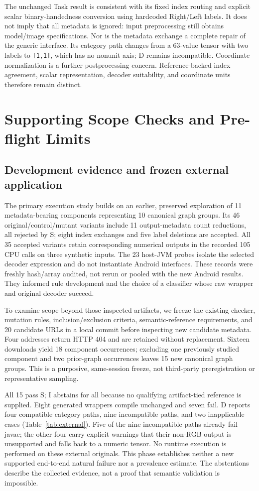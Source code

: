 \documentclass[10pt,twocolumn,letterpaper]{article}
\newcommand{\code}[1]{\texttt{#1}}
\begin{document}
The unchanged Task result is consistent with its fixed index routing and explicit scalar binary-handedness conversion using hardcoded Right/Left labels. It does not imply that all metadata is ignored: input preprocessing still obtains model/image specifications. Nor is the metadata exchange a complete repair of the generic interface. Its category path changes from a 63-value tensor with two labels to \code{[1,1]}, which has no nonunit axis; D remains incompatible. Coordinate normalization is a further postprocessing concern. Reference-backed index agreement, scalar representation, decoder suitability, and coordinate units therefore remain distinct.

\section{Supporting Scope Checks and Pre-flight Limits}
\label{sec:scope}
\subsection{Development evidence and frozen external application}
The primary execution study builds on an earlier, preserved exploration of 11 metadata-bearing components representing 10 canonical graph groups. Its 46 original/control/mutant variants include 11 output-metadata count reductions, all rejected by S; eight index exchanges and five label deletions are accepted. All 35 accepted variants retain corresponding numerical outputs in the recorded 105 CPU calls on three synthetic inputs. The 23 host-JVM probes isolate the selected decoder expression and do not instantiate Android interfaces. These records were freshly hash/array audited, not rerun or pooled with the new Android results. They informed rule development and the choice of a classifier whose raw wrapper and original decoder succeed.

To examine scope beyond those inspected artifacts, we freeze the existing checker, mutation rules, inclusion/exclusion criteria, semantic-reference requirements, and 20 candidate URLs in a local commit before inspecting new candidate metadata. Four addresses return HTTP 404 and are retained without replacement. Sixteen downloads yield 18 component occurrences; excluding one previously studied component and two prior-graph occurrences leaves 15 new canonical graph groups. This is a purposive, same-session freeze, not third-party preregistration or representative sampling.

All 15 pass S; I abstains for all because no qualifying artifact-tied reference is supplied. Eight generated wrappers compile unchanged and seven fail. D reports four compatible category paths, nine incompatible paths, and two inapplicable cases (Table~\ref{tab:external}). Five of the nine incompatible paths already fail javac; the other four carry explicit warnings that their non-RGB output is unsupported and falls back to a numeric tensor. No runtime execution is performed on these external originals. This phase establishes neither a new supported end-to-end natural failure nor a prevalence estimate. The abstentions describe the collected evidence, not a proof that semantic validation is impossible.
\end{document}

